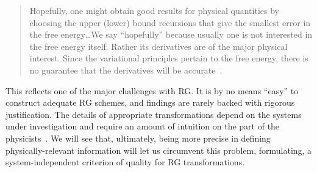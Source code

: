 \begin{quote}
  Hopefully, one might obtain good results for physical quantities by
  choosing the upper (lower) bound recursions that give the smallest
  error in the free energy\ldots We say ``hopefully'' because usually
  one is not interested in the free energy itself. Rather its
  derivatives are of the major physical interest.  Since the
  variational principles pertain to the free energy, there is no
  guarantee that the derivatives will be accurate~\cite{kadanoff}.
\end{quote}\label{sec:kadanoff-quote}
%
This reflects one of the major challenges with RG\@.  It is by no
means ``easy'' to construct adequate RG schemes, and findings are
rarely backed with rigorous justification. The details of appropriate
transformations depend on the systems under investigation and require
an amount of intuition on the part of the physicists~\cite{kjr}.  We
will see that, ultimately, being more precise in defining
physically-relevant information will let us circumvent this problem,
formulating, a system-independent criterion of quality for RG
transformations.
